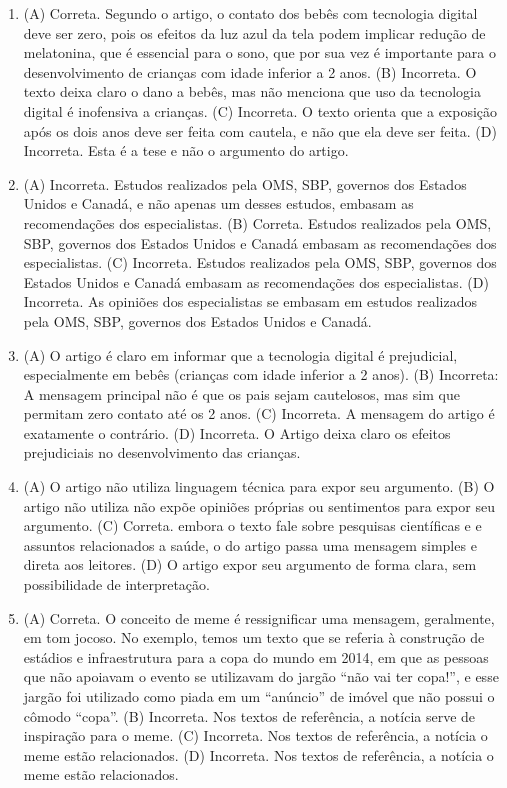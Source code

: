 \begin{enumerate}
\item (A) Correta. Segundo o artigo, o contato dos bebês com tecnologia digital
deve ser zero, pois os efeitos da luz azul da tela podem implicar
redução de melatonina, que é essencial para o sono, que por sua vez é
importante para o desenvolvimento de crianças com idade inferior a 2
anos.
(B) Incorreta. O texto deixa claro o dano a bebês, mas não menciona que
uso da tecnologia digital é inofensiva a crianças.
(C) Incorreta. O texto orienta que a exposição após os dois anos deve ser
feita com cautela, e não que ela deve ser feita.
(D) Incorreta. Esta é a tese e não o argumento do artigo.

\item (A)
  Incorreta. Estudos realizados pela OMS, SBP, governos dos Estados
  Unidos e Canadá, e não apenas um desses estudos, embasam as
  recomendações dos especialistas.
(B) Correta. Estudos realizados pela OMS, SBP, governos dos Estados
Unidos e Canadá embasam as recomendações dos especialistas.
(C)
  Incorreta. Estudos realizados pela OMS, SBP, governos dos Estados
  Unidos e Canadá embasam as recomendações dos especialistas.
(D)
  Incorreta. As opiniões dos especialistas se embasam em estudos
  realizados pela OMS, SBP, governos dos Estados Unidos e Canadá.

\item (A) O artigo é claro em informar que a tecnologia digital é prejudicial,
especialmente em bebês (crianças com idade inferior a 2 anos).
(B) Incorreta: A mensagem principal não é que os pais sejam cautelosos,
mas sim que permitam zero contato até os 2 anos.
(C) Incorreta. A mensagem do artigo é exatamente o contrário.
(D) Incorreta. O Artigo deixa claro os efeitos prejudiciais no
desenvolvimento das crianças.

\item (A) O artigo não utiliza linguagem técnica para expor seu argumento.
(B) O artigo não utiliza não expõe opiniões próprias ou sentimentos para
expor seu argumento.
(C) Correta. embora o texto fale sobre pesquisas científicas e e assuntos
relacionados a saúde, o do artigo passa uma mensagem simples e direta
aos leitores.
(D) O artigo expor seu argumento de forma clara, sem possibilidade de
interpretação.

\item (A) Correta. O conceito de meme é ressignificar uma mensagem, geralmente,
em tom jocoso. No exemplo, temos um texto que se referia à construção de
estádios e infraestrutura para a copa do mundo em 2014, em que as
pessoas que não apoiavam o evento se utilizavam do jargão ``não vai ter
copa!'', e esse jargão foi utilizado como piada em um ``anúncio'' de
imóvel que não possui o cômodo ``copa''.
(B) Incorreta. Nos textos de referência, a notícia serve de inspiração
para o meme.
(C) Incorreta. Nos textos de referência, a notícia o meme estão
relacionados.
(D) Incorreta. Nos textos de referência, a notícia o meme estão
relacionados.


\end{enumerate}
